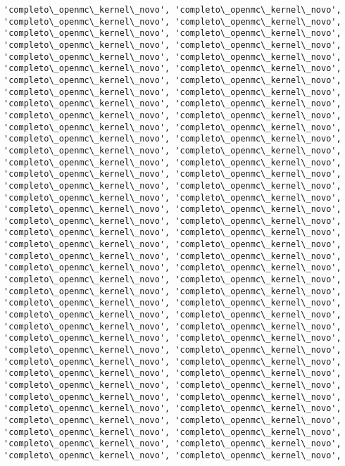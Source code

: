 \documentclass[11pt]{article}
\begin{document}
\begin{Verbatim}[commandchars=\\\{\}]
'completo\_openmc\_kernel\_novo', 'completo\_openmc\_kernel\_novo',
'completo\_openmc\_kernel\_novo', 'completo\_openmc\_kernel\_novo',
'completo\_openmc\_kernel\_novo', 'completo\_openmc\_kernel\_novo',
'completo\_openmc\_kernel\_novo', 'completo\_openmc\_kernel\_novo',
'completo\_openmc\_kernel\_novo', 'completo\_openmc\_kernel\_novo',
'completo\_openmc\_kernel\_novo', 'completo\_openmc\_kernel\_novo',
'completo\_openmc\_kernel\_novo', 'completo\_openmc\_kernel\_novo',
'completo\_openmc\_kernel\_novo', 'completo\_openmc\_kernel\_novo',
'completo\_openmc\_kernel\_novo', 'completo\_openmc\_kernel\_novo',
'completo\_openmc\_kernel\_novo', 'completo\_openmc\_kernel\_novo',
'completo\_openmc\_kernel\_novo', 'completo\_openmc\_kernel\_novo',
'completo\_openmc\_kernel\_novo', 'completo\_openmc\_kernel\_novo',
'completo\_openmc\_kernel\_novo', 'completo\_openmc\_kernel\_novo',
'completo\_openmc\_kernel\_novo', 'completo\_openmc\_kernel\_novo',
'completo\_openmc\_kernel\_novo', 'completo\_openmc\_kernel\_novo',
'completo\_openmc\_kernel\_novo', 'completo\_openmc\_kernel\_novo',
'completo\_openmc\_kernel\_novo', 'completo\_openmc\_kernel\_novo',
'completo\_openmc\_kernel\_novo', 'completo\_openmc\_kernel\_novo',
'completo\_openmc\_kernel\_novo', 'completo\_openmc\_kernel\_novo',
'completo\_openmc\_kernel\_novo', 'completo\_openmc\_kernel\_novo',
'completo\_openmc\_kernel\_novo', 'completo\_openmc\_kernel\_novo',
'completo\_openmc\_kernel\_novo', 'completo\_openmc\_kernel\_novo',
'completo\_openmc\_kernel\_novo', 'completo\_openmc\_kernel\_novo',
'completo\_openmc\_kernel\_novo', 'completo\_openmc\_kernel\_novo',
'completo\_openmc\_kernel\_novo', 'completo\_openmc\_kernel\_novo',
'completo\_openmc\_kernel\_novo', 'completo\_openmc\_kernel\_novo',
'completo\_openmc\_kernel\_novo', 'completo\_openmc\_kernel\_novo',
'completo\_openmc\_kernel\_novo', 'completo\_openmc\_kernel\_novo',
'completo\_openmc\_kernel\_novo', 'completo\_openmc\_kernel\_novo',
'completo\_openmc\_kernel\_novo', 'completo\_openmc\_kernel\_novo',
'completo\_openmc\_kernel\_novo', 'completo\_openmc\_kernel\_novo',
'completo\_openmc\_kernel\_novo', 'completo\_openmc\_kernel\_novo',
'completo\_openmc\_kernel\_novo', 'completo\_openmc\_kernel\_novo',
'completo\_openmc\_kernel\_novo', 'completo\_openmc\_kernel\_novo',
'completo\_openmc\_kernel\_novo', 'completo\_openmc\_kernel\_novo',
'completo\_openmc\_kernel\_novo', 'completo\_openmc\_kernel\_novo',
'completo\_openmc\_kernel\_novo', 'completo\_openmc\_kernel\_novo',
'completo\_openmc\_kernel\_novo', 'completo\_openmc\_kernel\_novo',
'completo\_openmc\_kernel\_novo', 'completo\_openmc\_kernel\_novo',

\end{Verbatim}
\end{document}
